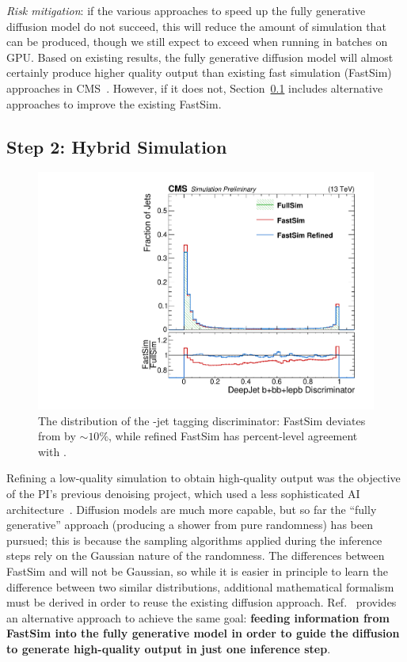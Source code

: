 \textit{Risk mitigation}: if the various approaches to speed up the fully generative diffusion model do not succeed,
this will reduce the amount of simulation that can be produced,
though we still expect to exceed \GEANTfour when running in batches on GPU.
Based on existing results, the fully generative diffusion model will almost certainly produce higher quality output than existing fast simulation (FastSim) approaches in CMS~\cite{Sekmen:2016iql}.
However, if it does not, Section~\ref{subsec:refine} includes alternative approaches to improve the existing FastSim.

\subsection{Step 2: Hybrid Simulation}\label{subsec:refine}

\begin{figure}
\centering
\includegraphics[width=0.49\myfigurewidth]{figures/Regression_20221127_DeepFlavB_preliminary.pdf}
\caption{The distribution of the \DEEPJET \cPqb-jet tagging discriminator: FastSim deviates from \GEANTfour by ${\sim}10\%$, while refined FastSim has percent-level agreement with \GEANTfour.}
\label{fig:refine}
\end{figure}

Refining a low-quality simulation to obtain high-quality output was the objective of the PI's previous denoising project, which used a less sophisticated AI architecture~\cite{Banerjee:2022gkg}.
Diffusion models are much more capable, but so far the ``fully generative'' approach (producing a shower from pure randomness) has been pursued;
this is because the sampling algorithms applied during the inference steps rely on the Gaussian nature of the randomness.
The differences between FastSim and \GEANTfour will not be Gaussian, so while it is easier in principle to learn the difference between two similar distributions,
additional mathematical formalism must be derived in order to reuse the existing diffusion approach.
Ref.~\cite{Mei:2023} provides an alternative approach to achieve the same goal:
\textbf{feeding information from FastSim into the fully generative model in order to guide the diffusion to generate high-quality output in just one inference step}.

